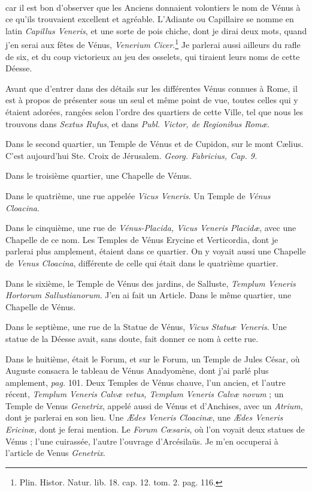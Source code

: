 \documentclass[a4paper, 11pt, oneside, polutonikogreek, french]{article}
\begin{document}
\paragraph{}
car il est bon d'observer que les Anciens donnaient volontiers le nom de Vénus à ce qu'ils trouvaient excellent et agréable. L'Adiante ou Capillaire se nomme en latin \emph{Capillus Veneris}, et une sorte de pois chiche, dont je dirai deux mots, quand j'en serai aux fêtes de Vénus, \emph{Venerium Cicer}.\footnote{Plin. Histor. Natur. lib. 18. cap. 12. tom. 2. pag. 116.} Je parlerai aussi ailleurs du rafle de six, et du coup victorieux au jeu des osselets, qui tiraient leurs noms de cette Déesse.

Avant que d'entrer dans des détails sur les différentes Vénus connues à Rome, il est à propos de présenter sous un seul et même point de vue, toutes celles qui y étaient adorées, rangées selon l'ordre des quartiers de cette Ville, tel que nous les trouvons dans \emph{Sextus Rufus}, et dans \emph{Publ. Victor, de Regionibus Romæ}.

Dans le second quartier, un Temple de Vénus et de Cupidon, sur le mont Cælius. C'est aujourd'hui Ste. Croix de Jérusalem. \emph{Georg. Fabricius, Cap. 9.}

Dans le troisième quartier, une Chapelle de Vénus.

Dans le quatrième, une rue appelée \emph{Vicus Veneris}. Un Temple de \emph{Vénus Cloacina}.

Dans le cinquième, une rue de \emph{Vénus-Placida, Vicus Veneris Placidæ}, avec une Chapelle de ce nom. Les Temples de Vénus Erycine et Verticordia, dont je parlerai plus amplement, étaient dans ce quartier. On y voyait aussi une Chapelle de \emph{Venus Cloacina}, différente de celle qui était dans le quatrième quartier.

Dans le sixième, le Temple de Vénus des jardins, de Salluste, \emph{Templum Veneris Hortorum Sallustianorum}. J'en ai fait un Article. Dans le même quartier, une Chapelle de Vénus.

Dans le septième, une rue de la Statue de Vénus, \emph{Vicus Statuæ Veneris}. Une statue de la Déesse avait, sans doute, fait donner ce nom à cette rue.

Dans le huitième, était le Forum, et sur le Forum, un Temple de Jules César, où Auguste consacra le tableau de Vénus Anadyomène, dont j'ai parlé plus amplement, \emph{pag.} 101. Deux Temples de Vénus chauve, l'un ancien, et l'autre récent, \emph{Templum Veneris Calvæ vetus, Templum Veneris Calvæ novum} ; un Temple de Venus \emph{Genetrix}, appelé aussi de Vénus et d'Anchises, avec un \emph{Atrium}, dont je parlerai en son lieu. Une \emph{Ædes Veneris Cloacinæ}, une \emph{Ædes Veneris Ericinœ}, dont je ferai mention. Le \emph{Forum Cœsaris}, où l'on voyait deux statues de Vénus ; l'une cuirassée, l'autre l'ouvrage d'Arcésilaüs. Je m'en occuperai à l'article de Venus \emph{Genetrix}.
\end{document}
